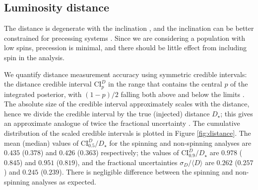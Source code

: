 \subsection{Luminosity distance}\label{sec:distance}

The distance is degenerate with the inclination \citep{Cutler_1994,Aasi_2013}, and the inclination can be better constrained for precessing systems \citep{van_der_Sluys_2008,Vitale_2014}. Since we are considering a population with low spins, precession is minimal, and there should be little effect from including spin in the analysis.

We quantify distance measurement accuracy using symmetric credible intervals: the distance credible interval $\mathrm{CI}_p^{D}$ in the range that contains the central $p$ of the integrated posterior, with $(1-p)/2$ falling both above and below the limits \citep{Aasi_2013}. The absolute size of the credible interval approximately scales with the distance, hence we divide the credible interval by the true (injected) distance $D_\star$; this gives an approximate analogue of twice the fractional uncertainty \citep{Berry_2014}. The cumulative distribution of the scaled credible intervals is plotted in Figure \ref{fig:distance}. The mean (median) values of $\mathrm{CI}_{0.5}^{D}/D_\star$ for the spinning and non-spinning analyses are $0.435$ ($0.378$) and $0.426$ ($0.363$) respectively; the values of $\mathrm{CI}_{0.9}^{D}/D_\star$ are $0.978$ ($0.845$) and $0.951$ ($0.819$), and the fractional uncertainties $\sigma_D/\langle D\rangle$ are $0.262$ ($0.257$) and $0.245$ ($0.239$). There is negligible difference between the spinning and non-spinning analyses as expected.


  
  
  